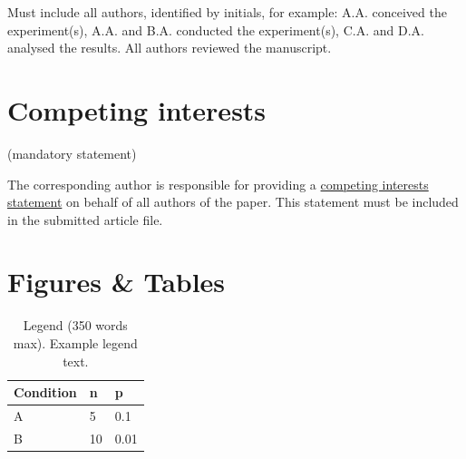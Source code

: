 \documentclass[fleqn,10pt]{wlscirep}
\begin{document}
Must include all authors, identified by initials, for example:
A.A. conceived the experiment(s), A.A. and B.A. conducted the experiment(s), C.A. and D.A. analysed the results. All authors reviewed the manuscript. 

\section*{Competing interests} (mandatory statement)

The corresponding author is responsible for providing a \href{https://www.nature.com/sdata/policies/editorial-and-publishing-policies#competing}{competing interests statement} on behalf of all authors of the paper. This statement must be included in the submitted article file.

\section*{Figures \& Tables}


\begin{table}[ht]
\centering
\begin{tabular}{|l|l|l|}
\hline
Condition & n & p \\
\hline
A & 5 & 0.1 \\
\hline
B & 10 & 0.01 \\
\hline
\end{tabular}
\caption{\label{tab:example}Legend (350 words max). Example legend text.}
\end{table}
\end{document}
